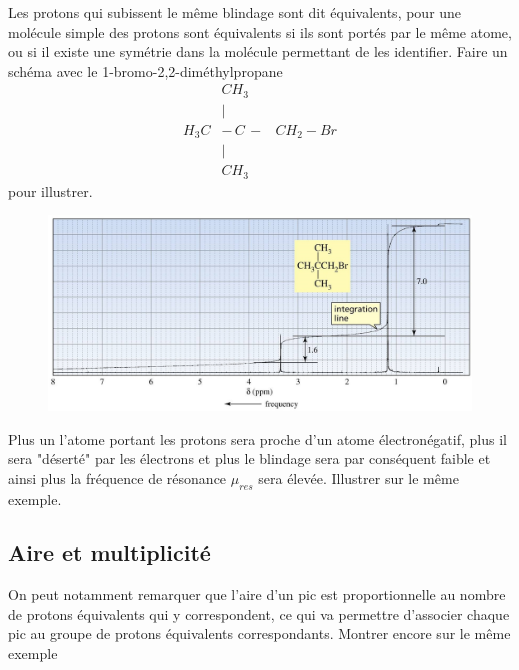 \documentclass[12pt,prb,aps,epsf]{report}
\begin{document}
Les protons qui subissent le même blindage sont dit équivalents, pour une molécule simple des protons sont équivalents si ils sont portés par le même atome, ou si il existe une symétrie dans la molécule permettant de les identifier. Faire un schéma avec le 1-bromo-2,2-diméthylpropane
\begin{eqnarray}
&CH_3& \nonumber\\
&|& \nonumber \\
H_3C  &-\,C\,-&CH_2-Br\\
&|& \nonumber \\
&CH_3& \nonumber
\end{eqnarray}
 pour illustrer.\\
\begin{figure}[h]
	\centerline{\includegraphics[width=14cm]{spectreRMN1}}
\end{figure}

Plus un l'atome portant les protons sera proche d'un atome électronégatif, plus il sera "déserté" par les électrons et plus le blindage sera par conséquent faible et ainsi plus la fréquence de résonance $\mu_{res}$ sera élevée. Illustrer sur le même exemple.\\

\subsection{Aire et multiplicité}
On peut notamment remarquer que l'aire d'un pic est proportionnelle au nombre de protons équivalents qui y correspondent, ce qui va permettre d'associer chaque pic au groupe de protons équivalents correspondants. Montrer encore sur le même exemple\\
\end{document}

